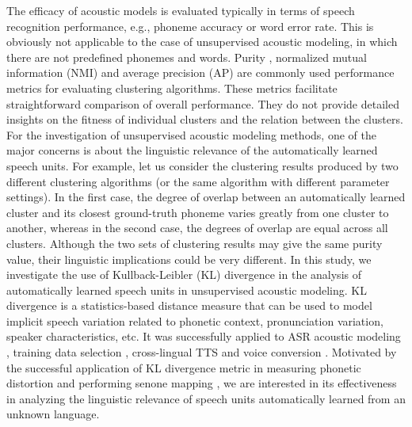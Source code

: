 \documentclass[a4paper]{article}
\begin{document}
The efficacy of acoustic models is evaluated typically in terms of speech recognition performance, e.g., phoneme accuracy or word error rate. This is obviously not applicable to the case of unsupervised acoustic modeling, in which there are not predefined phonemes and words. Purity \cite{I3EWang}\cite{feng2016exploit}, normalized mutual information (NMI)  \cite{I3EWang} and average precision (AP) \cite{jansen2013weak} are commonly used performance metrics for evaluating clustering algorithms. These metrics facilitate straightforward comparison of overall performance. They do not provide detailed insights on the fitness of individual clusters and the relation between the clusters. For the investigation of unsupervised acoustic modeling methods, one of the major concerns is about the linguistic relevance of the automatically learned speech units.
For example, let us consider the clustering results produced by two different clustering algorithms (or the same algorithm with different parameter settings). In the first case, the degree of overlap between an automatically learned cluster and its closest ground-truth phoneme varies greatly from one cluster to another, whereas in the second case, the degrees of overlap are equal across all clusters. Although the two sets of clustering results may give the same purity value, their linguistic implications could be very different.
In this study, we investigate the use of Kullback-Leibler (KL) divergence in the analysis of automatically learned speech units in unsupervised acoustic modeling.
KL divergence is a statistics-based distance measure that can be used to model implicit speech variation related to phonetic context, pronunciation variation, speaker characteristics, etc. It was successfully applied to ASR acoustic modeling \cite{aradilla2007acoustic}\cite{aradilla2008using}, training data selection \cite{asami2015training}, cross-lingual TTS \cite{xie2016kl} and voice conversion \cite{xie2016klvc}. 
Motivated by the successful application of KL divergence metric in measuring phonetic distortion and performing senone mapping \cite{xie2016kl}\cite{xie2016klvc}, we are interested in its effectiveness in analyzing the linguistic relevance of speech units automatically learned from an unknown language.
\end{document}
